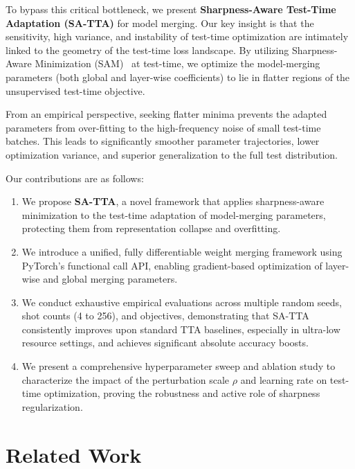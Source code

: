 \documentclass{article}
\theoremstyle{plain}
\theoremstyle{definition}
\theoremstyle{remark}
\begin{document}
To bypass this critical bottleneck, we present \textbf{Sharpness-Aware Test-Time Adaptation (SA-TTA)} for model merging. Our key insight is that the sensitivity, high variance, and instability of test-time optimization are intimately linked to the geometry of the test-time loss landscape. By utilizing Sharpness-Aware Minimization (SAM)~\cite{foret2020sharpness} at test-time, we optimize the model-merging parameters (both global and layer-wise coefficients) to lie in flatter regions of the unsupervised test-time objective. 

From an empirical perspective, seeking flatter minima prevents the adapted parameters from over-fitting to the high-frequency noise of small test-time batches. This leads to significantly smoother parameter trajectories, lower optimization variance, and superior generalization to the full test distribution.

Our contributions are as follows:
\begin{enumerate}
    \item We propose \textbf{SA-TTA}, a novel framework that applies sharpness-aware minimization to the test-time adaptation of model-merging parameters, protecting them from representation collapse and overfitting.
    \item We introduce a unified, fully differentiable weight merging framework using PyTorch's functional call API, enabling gradient-based optimization of layer-wise and global merging parameters.
    \item We conduct exhaustive empirical evaluations across multiple random seeds, shot counts (4 to 256), and objectives, demonstrating that SA-TTA consistently improves upon standard TTA baselines, especially in ultra-low resource settings, and achieves significant absolute accuracy boosts.
    \item We present a comprehensive hyperparameter sweep and ablation study to characterize the impact of the perturbation scale $\rho$ and learning rate on test-time optimization, proving the robustness and active role of sharpness regularization.
\end{enumerate}

\section{Related Work}
\label{sec:related}
\end{document}

